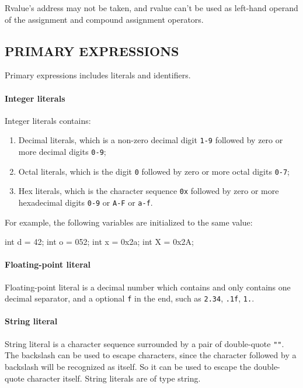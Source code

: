 \documentclass{article}
\begin{document}
Rvalue's address may not be taken, and rvalue can't be used as left-hand operand of the assignment and compound assignment operators.

\subsection{PRIMARY EXPRESSIONS}

Primary expressions includes literals and identifiers.

\paragraph{Integer literals} Integer literals contains:

\begin{enumerate}
	\item Decimal literals, which is a non-zero decimal digit \verb|1-9| followed by zero or more decimal digits \verb|0-9|;
	\item Octal literals, which is the digit \verb|0| followed by zero or more octal digits \verb|0-7|;
	\item Hex literals, which is the character sequence \verb|0x| followed by zero or more hexadecimal digits \verb|0-9| or \verb|A-F| or \verb|a-f|.
\end{enumerate}

For example, the following variables are initialized to the same value:

\begin{MUAvbt}
int d = 42;
int o = 052;
int x = 0x2a;
int X = 0x2A;
\end{MUAvbt}

\paragraph{Floating-point literal} Floating-point literal is a decimal number which contains and only contains one decimal separator, and a optional \verb|f| in the end, such as \verb|2.34|, \verb|.1f|, \verb|1.|.

\paragraph{String literal} String literal is a character sequence surrounded by a pair of double-quote \verb|""|. The backslash can be used to escape characters, since the character followed by a backslash will be recognized as itself. So it can be used to escape the double-quote character itself. String literals are of type string.
\end{document}

